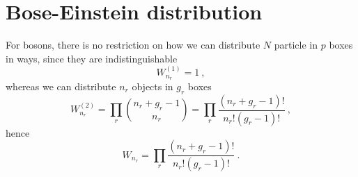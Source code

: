 \section{Bose-Einstein distribution}

    For bosons, there is no restriction on how we can distribute $N$ particle in $p$ boxes in ways, since they are indistinguishable
    \begin{equation*}
        W^{(1)}_{n_r} = 1 ~,
    \end{equation*}
    whereas we can distribute $n_r$ objects in $g_r$ boxes
    \begin{equation*}
        W^{(2)}_{n_r} = \prod_r \binom{n_r + g_r - 1}{n_r} = \prod_r \frac{(n_r + g_r - 1)!}{n_r! (g_r - 1)!} ~,
    \end{equation*}
    hence 
    \begin{equation*}
        W_{n_r} = \prod_r \frac{(n_r + g_r - 1)!}{n_r! (g_r - 1)!} ~.
    \end{equation*}
    
